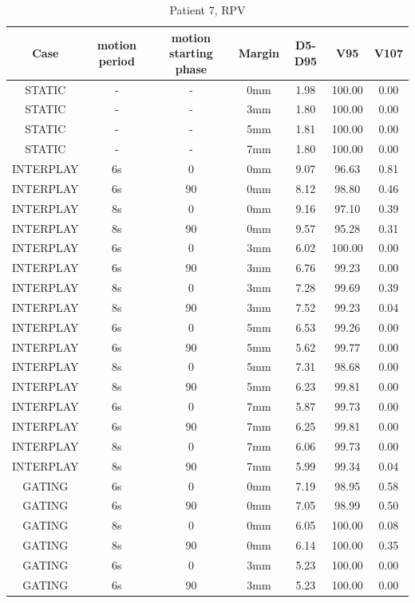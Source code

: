 \documentclass[type=dr, dr=rernat, accentcolor=tud7b,colorbacktitle, bigchapter, openright, twoside, 12pt ]{tudthesis}
\begin{document}
\begin{table}[H]
  \centering
  \caption{Patient 7, RPV}
  \begin{tabular}{|c||c|c|c||c|c|c|}
    \hline\hline
    Case & motion period & motion starting phase & Margin & D5-D95 & V95 & V107\\
    \hline 
STATIC & - & - & 0mm & 1.98 & 100.00 & 0.00 \\
STATIC & - & - & 3mm & 1.80 & 100.00 & 0.00 \\
STATIC & - & - & 5mm & 1.81 & 100.00 & 0.00 \\
STATIC & - & - & 7mm & 1.80 & 100.00 & 0.00 \\
INTERPLAY & 6s & 0 & 0mm & 9.07 & 96.63 & 0.81 \\
INTERPLAY & 6s & 90 & 0mm & 8.12 & 98.80 & 0.46 \\
INTERPLAY & 8s & 0 & 0mm & 9.16 & 97.10 & 0.39 \\
INTERPLAY & 8s & 90 & 0mm & 9.57 & 95.28 & 0.31 \\
INTERPLAY & 6s & 0 & 3mm & 6.02 & 100.00 & 0.00 \\
INTERPLAY & 6s & 90 & 3mm & 6.76 & 99.23 & 0.00 \\
INTERPLAY & 8s & 0 & 3mm & 7.28 & 99.69 & 0.39 \\
INTERPLAY & 8s & 90 & 3mm & 7.52 & 99.23 & 0.04 \\
INTERPLAY & 6s & 0 & 5mm & 6.53 & 99.26 & 0.00 \\
INTERPLAY & 6s & 90 & 5mm & 5.62 & 99.77 & 0.00 \\
INTERPLAY & 8s & 0 & 5mm & 7.31 & 98.68 & 0.00 \\
INTERPLAY & 8s & 90 & 5mm & 6.23 & 99.81 & 0.00 \\
INTERPLAY & 6s & 0 & 7mm & 5.87 & 99.73 & 0.00 \\
INTERPLAY & 6s & 90 & 7mm & 6.25 & 99.81 & 0.00 \\
INTERPLAY & 8s & 0 & 7mm & 6.06 & 99.73 & 0.00 \\
INTERPLAY & 8s & 90 & 7mm & 5.99 & 99.34 & 0.04 \\
GATING & 6s & 0 & 0mm & 7.19 & 98.95 & 0.58 \\
GATING & 6s & 90 & 0mm & 7.05 & 98.99 & 0.50 \\
GATING & 8s & 0 & 0mm & 6.05 & 100.00 & 0.08 \\
GATING & 8s & 90 & 0mm & 6.14 & 100.00 & 0.35 \\
GATING & 6s & 0 & 3mm & 5.23 & 100.00 & 0.00 \\
GATING & 6s & 90 & 3mm & 5.23 & 100.00 & 0.00 \\

\end{tabular}
\end{table}
\end{document}
